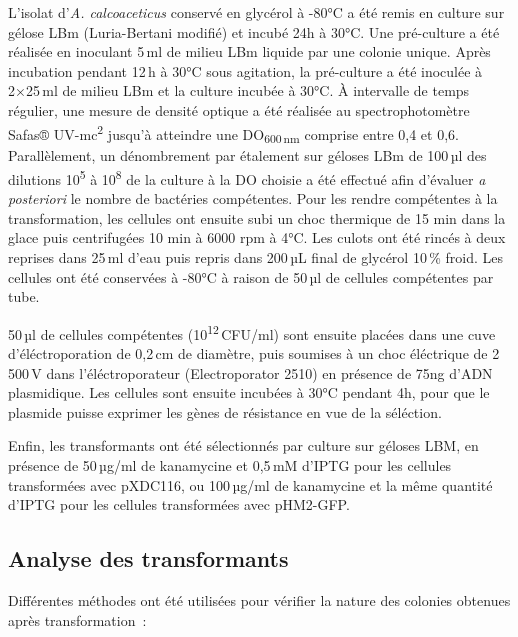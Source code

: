 L'isolat d'\textit{A. calcoaceticus} conservé en glycérol à -80°C a été remis en culture sur gélose LBm (Luria-Bertani modifié) et incubé 24h à 30°C.
Une pré-culture a été réalisée en inoculant 5\,ml de milieu LBm liquide par une colonie unique.
Après incubation pendant 12\,h à 30°C sous agitation, la pré-culture a été inoculée à 2×25\,ml de milieu LBm et la culture incubée à 30°C.
À intervalle de temps régulier, une mesure de densité optique a été réalisée au spectrophotomètre Safas® UV-mc\textsuperscript{2} jusqu'à atteindre une DO\textsubscript{600\,nm} comprise entre 0,4 et 0,6.
Parallèlement, un dénombrement par étalement sur géloses LBm de 100\,µl des dilutions 10\textsuperscript{5} à 10\textsuperscript{8} de la culture à la DO choisie a été effectué afin d'évaluer \textit{a posteriori} le nombre de bactéries compétentes.
Pour les rendre compétentes à la transformation, les cellules ont ensuite subi un choc thermique de 15 min dans la glace puis centrifugées 10 min à 6000 rpm à 4°C. 
Les culots ont été rincés à deux reprises dans 25\,ml d'eau puis repris dans 200\,µL final de glycérol 10\,\% froid.
Les cellules ont été conservées à -80°C à raison de 50\,µl de cellules compétentes par tube.

50\,µl de cellules compétentes (10\textsuperscript{12}\,CFU/ml) sont ensuite placées dans une cuve d'éléctroporation de 0,2\,cm de diamètre, puis soumises à un choc éléctrique de 2\,500\,V dans l'éléctroporateur (Electroporator 2510) en présence de 75ng d'ADN plasmidique.
Les cellules sont ensuite incubées à 30°C pendant 4h, pour que le plasmide puisse exprimer les gènes de résistance en vue de la séléction.

Enfin, les transformants ont été sélectionnés par culture sur géloses LBM, en présence de 50\,µg/ml de kanamycine et 0,5\,mM d'IPTG pour les cellules transformées avec pXDC116, ou 100\,µg/ml de kanamycine et la même quantité d'IPTG pour les cellules transformées avec pHM2-GFP.

\subsection{Analyse des transformants}

Différentes méthodes ont été utilisées pour vérifier la nature des colonies obtenues après transformation~:
